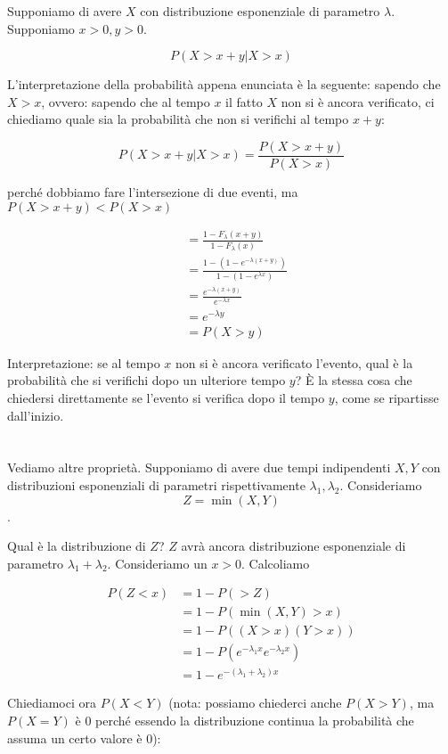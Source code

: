 \documentclass[a4paper,12pt]{book}
\begin{document}
Supponiamo di avere $ X $ con distribuzione esponenziale di parametro $\lambda$. Supponiamo $ x > 0, y > 0 $.

$$ P(X > x + y | X > x) $$

L'interpretazione della probabilità appena enunciata è la seguente: sapendo che $ X > x $, ovvero: sapendo che al tempo $ x $ il fatto $ X $ non si è ancora verificato, ci chiediamo quale sia la probabilità che non si verifichi al tempo $ x+y $:

$$ P(X > x + y | X > x) = \frac{P(X>x+y)}{P(X > x)}$$

perché dobbiamo fare l'intersezione di due eventi, ma $ P(X>x+y) < P(X>x) $

\begin{align*}
	& = \frac{1 - F_\lambda (x+y)}{1-F_\lambda(x)} \\
	& = \frac{1- (1-e^{-\lambda(x+y)})}{1-(1-e^{\lambda x})} \\
	& = \frac{e^{-\lambda(x+y)}}{e^{-\lambda x}} \\
	& = e^{-\lambda y} \\
	& = P(X > y)
\end{align*}

Interpretazione: se al tempo $ x $ non si è ancora verificato l'evento, qual è la probabilità che si verifichi dopo un ulteriore tempo $ y $? È la stessa cosa che chiedersi direttamente se l'evento si verifica dopo il tempo $ y $, come se ripartisse dall'inizio. 
\\
\\
\\
Vediamo altre proprietà. Supponiamo di avere due tempi indipendenti $ X, Y $ con distribuzioni esponenziali di parametri rispettivamente $\lambda_1, \lambda_2$. Consideriamo
$$ Z = \min(X, Y) $$.

Qual è la distribuzione di $ Z $? $ Z $ avrà ancora distribuzione esponenziale di parametro $ \lambda_1 + \lambda_2 $. Consideriamo un $ x > 0 $. Calcoliamo

\begin{align*}
	P(Z < x) & = 1 - P( > Z) \\
	& = 1 - P(\min(X, Y) > x) \\
	& = 1 - P((X > x)(Y > x)) \\
	& = 1 - P(e^{-\lambda_1 x} e^{-\lambda_2 x}) \\
	& = 1 - e^{-(\lambda_1 + \lambda_2)x}
\end{align*}

Chiediamoci ora $ P(X < Y) $ (nota: possiamo chiederci anche $ P(X > Y) $, ma $ P(X=Y) $ è 0 perché essendo la distribuzione continua la probabilità che assuma un certo valore è 0):
\end{document}

